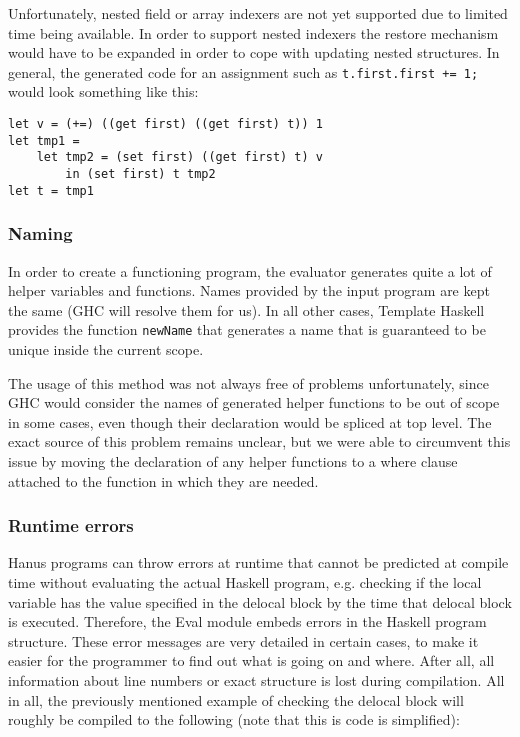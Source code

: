 \documentclass[12pt,a4paper]{article}
\begin{document}
Unfortunately, nested field or array indexers are not yet supported due to limited time being available. In order to support nested indexers the restore mechanism would have to be expanded in order to cope with updating nested structures. In general, the generated code for an assignment such as \texttt{t.first.first += 1;} would look something like this: 

\begin{verbatim}
let v = (+=) ((get first) ((get first) t)) 1
let tmp1 = 
    let tmp2 = (set first) ((get first) t) v 
        in (set first) t tmp2
let t = tmp1
\end{verbatim}

\subsubsection{Naming}
In order to create a functioning program, the evaluator generates quite a lot of helper variables and functions. Names provided by the input program are kept the same (GHC will resolve them for us). In all other cases, Template Haskell provides the function \texttt{newName} that generates a name that is guaranteed to be unique inside the current scope. 

The usage of this method was not always free of problems unfortunately, since GHC would consider the names of generated helper functions to be out of scope in some cases, even though their declaration would be spliced at top level. The exact source of this problem remains unclear, but we were able to circumvent this issue by moving the declaration of any helper functions to a where clause attached to the function in which they are needed. 

\subsubsection{Runtime errors}
Hanus programs can throw errors at runtime that cannot be predicted at compile time without evaluating the actual Haskell program, e.g. checking if the local variable has the value specified in the delocal block by the time that delocal block is executed. Therefore, the Eval module embeds errors in the Haskell program structure. These error messages are very detailed in certain cases, to make it easier for the programmer to find out what is going on and where. After all, all information about line numbers or exact structure is lost during compilation. All in all, the previously mentioned example of checking the delocal block will roughly be compiled to the following (note that this is code is simplified):
\end{document}
